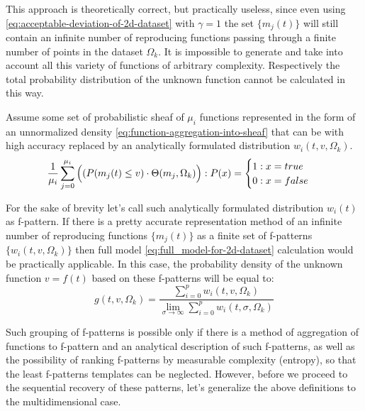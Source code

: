 \documentclass[a4paper, 11pt, oneside]{book}
\begin{document}
This approach is theoretically correct, but practically useless, since even using \ref{eq:acceptable-deviation-of-2d-dataset} with $\gamma = 1$ the set $\{m_j(t)\}$ will still contain an infinite number of reproducing functions passing through a finite number of points in the dataset $\Omega_k$. It is impossible to generate and take into account all this variety of functions of arbitrary complexity. Respectively the total probability distribution of the unknown function cannot be calculated in this way.

Assume some set of probabilistic sheaf of $\mu_i$ functions represented in the form of an unnormalized density \ref{eq:function-aggregation-into-sheaf} that can be with high accuracy replaced by an analytically formulated distribution $w_i(t, v, \Omega_k)$.
\begin{equation}\label{eq:function-aggregation-into-sheaf}
  \frac{1}{\mu_i} \sum_{j = 0}^{\mu_i} \Big((P(m_j(t) \leq v) \cdot \Theta(m_j, \Omega_k) \Big): P(x) =
  \begin{cases}
    1: x = true\\
    0: x = false
  \end{cases} \\
\end{equation}

For the sake of brevity let's call such analytically formulated distribution $w_i(t)$ as f-pattern. If there is a pretty accurate representation method of an infinite number of reproducing functions $\{m_j(t)\}$ as a finite set of f-patterns $\{w_i(t, v, \Omega_k)\}$ then full model \ref{eq:full_model-for-2d-dataset} calculation would be practically applicable. In this case, the probability density of the unknown function $v=f(t)$ based on these f-patterns will be equal to:
\begin{equation}\label{eq:full_model-for-2d-dataset-by-f-patterns}
  g(t, v, \Omega_k) = \frac{\displaystyle \sum_{i = 0}^p w_i(t, v, \Omega_k)}{\displaystyle \lim_{\sigma \to \infty}\sum_{i = 0}^p w_i(t, \sigma, \Omega_k)}
\end{equation}

Such grouping of f-patterns is possible only if there is a method of aggregation of functions to f-pattern and an analytical description of such f-patterns, as well as the possibility of ranking f-patterns by measurable complexity (entropy), so that the least f-patterns templates can be neglected. However, before we proceed to the sequential recovery of these patterns, let's generalize the above definitions to the multidimensional case.
\end{document}
